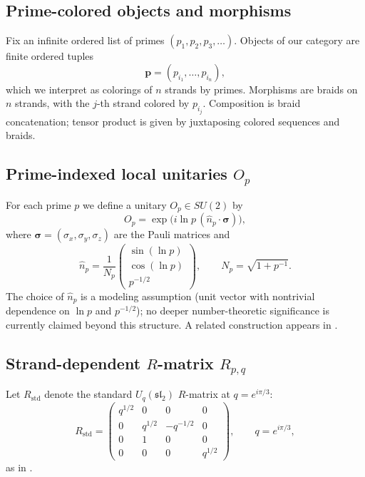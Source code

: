 \documentclass[11pt]{article}
\begin{document}
\subsection{Prime-colored objects and morphisms}

Fix an infinite ordered list of primes $(p_1,p_2,p_3,\dots)$. Objects of our category are finite ordered tuples
\[
  \mathbf{p} = (p_{i_1},\dots,p_{i_n}),
\]
which we interpret as colorings of $n$ strands by primes. Morphisms are braids on $n$ strands, with the $j$-th strand colored by $p_{i_j}$. Composition is braid concatenation; tensor product is given by juxtaposing colored sequences and braids.

\subsection{Prime-indexed local unitaries $O_p$}

For each prime $p$ we define a unitary $O_p \in SU(2)$ by
\begin{equation}
  O_p = \exp\big(i \ln p \, (\hat n_p \cdot \bm{\sigma})\big),
  \label{eq:Op-def}
\end{equation}
where $\bm{\sigma} = (\sigma_x,\sigma_y,\sigma_z)$ are the Pauli matrices and
\begin{equation}
  \hat n_p = \frac{1}{N_p}
  \begin{pmatrix}
    \sin(\ln p) \\[4pt]
    \cos(\ln p) \\[4pt]
    p^{-1/2}
  \end{pmatrix},
  \qquad
  N_p = \sqrt{1 + p^{-1}}.
  \label{eq:n-hat}
\end{equation}
The choice of $\hat n_p$ is a modeling assumption (unit vector with nontrivial dependence on $\ln p$ and $p^{-1/2}$); no deeper number-theoretic significance is currently claimed beyond this structure. A related construction appears in \cite[Eq.~(1)--(2)]{MTv21}.

\subsection{Strand-dependent $R$-matrix $R_{p,q}$}

Let $R_{\mathrm{std}}$ denote the standard $U_q(\mathfrak{sl}_2)$ $R$-matrix at $q = e^{i\pi/3}$:
\begin{equation}
  R_{\mathrm{std}} =
  \begin{pmatrix}
    q^{1/2} & 0 & 0 & 0 \\
    0 & q^{1/2} & -q^{-1/2} & 0 \\
    0 & 1 & 0 & 0 \\
    0 & 0 & 0 & q^{1/2}
  \end{pmatrix},
  \qquad q = e^{i\pi/3},
  \label{eq:R-std}
\end{equation}
as in \cite[Eq.~(4)]{MTv21}.
\end{document}
